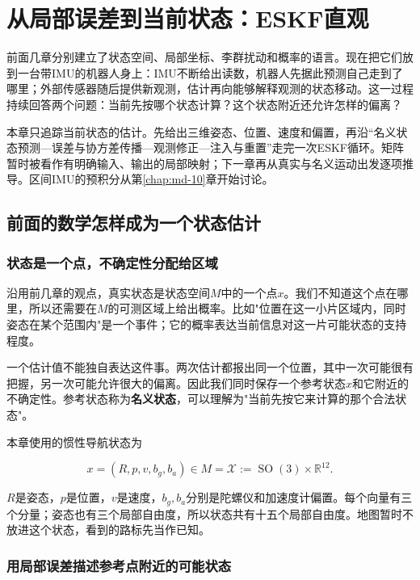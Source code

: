 \chapter{从局部误差到当前状态：ESKF直观}

\label{chap:md-08}

前面几章分别建立了状态空间、局部坐标、李群扰动和概率的语言。现在把它们放到一台带IMU的机器人身上：IMU不断给出读数，机器人先据此预测自己走到了哪里；外部传感器随后提供新观测，估计再向能够解释观测的状态移动。这一过程持续回答两个问题：当前先按哪个状态计算？这个状态附近还允许怎样的偏离？

本章只追踪当前状态的估计。先给出三维姿态、位置、速度和偏置，再沿“名义状态预测—误差与协方差传播—观测修正—注入与重置”走完一次ESKF循环。矩阵暂时被看作有明确输入、输出的局部映射；下一章再从真实与名义运动出发逐项推导。区间IMU的预积分从第\ref{chap:md-10}章开始讨论。

\section{前面的数学怎样成为一个状态估计}

\subsection{状态是一个点，不确定性分配给区域}

沿用前几章的观点，真实状态是状态空间$M$中的一个点$x$。我们不知道这个点在哪里，所以还需要在$M$的可测区域上给出概率。比如"位置在这一小片区域内，同时姿态在某个范围内"是一个事件；它的概率表达当前信息对这一片可能状态的支持程度。

一个估计值不能独自表达这件事。两次估计都报出同一个位置，其中一次可能很有把握，另一次可能允许很大的偏离。因此我们同时保存一个参考状态$\hat x$和它附近的不确定性。参考状态称为\textbf{名义状态}，可以理解为"当前先按它来计算的那个合法状态"。

本章使用的惯性导航状态为

\begin{equation*}
x=(R,p,v,b_g,b_a)\in M=\mathcal X:=\mathop{\mathrm{SO}}(3)\times\mathbb R^{12}.
\end{equation*}

$R$是姿态，$p$是位置，$v$是速度，$b_g,b_a$分别是陀螺仪和加速度计偏置。每个向量有三个分量；姿态也有三个局部自由度，所以状态共有十五个局部自由度。地图暂时不放进这个状态，看到的路标先当作已知。

\subsection{用局部误差描述参考点附近的可能状态}

